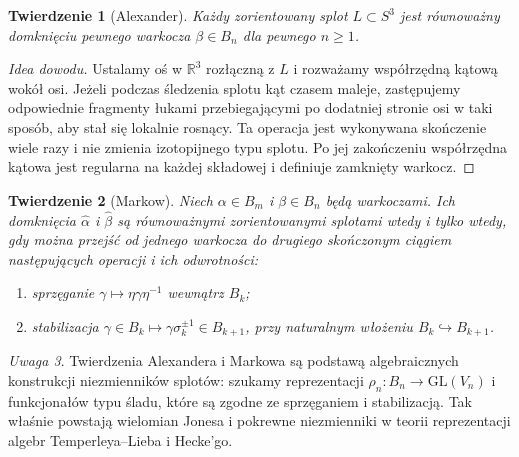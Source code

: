\documentclass[11pt,a4paper]{report}
\numberwithin{equation}{section}
\theoremstyle{plain}
\newtheorem{twierdzenie}{Twierdzenie}[section]
\theoremstyle{definition}
\theoremstyle{remark}
\newtheorem{uwaga}[twierdzenie]{Uwaga}
\begin{document}
\begin{twierdzenie}[Alexander]
Każdy zorientowany splot $L\subset S^3$ jest równoważny
domknięciu pewnego warkocza $\beta\in B_n$ dla pewnego $n\geq1$.
\end{twierdzenie}

\begin{proof}[Idea dowodu]
Ustalamy oś w $\mathbb R^3$ rozłączną z $L$ i rozważamy
współrzędną kątową wokół osi. Jeżeli podczas śledzenia splotu
kąt czasem maleje, zastępujemy odpowiednie fragmenty łukami
przebiegającymi po dodatniej stronie osi w taki sposób,
aby stał się lokalnie rosnący. Ta operacja jest wykonywana
skończenie wiele razy i nie zmienia izotopijnego typu splotu.
Po jej zakończeniu współrzędna kątowa jest regularna
na każdej składowej i definiuje zamknięty warkocz.
\end{proof}

\begin{twierdzenie}[Markow]
Niech $\alpha\in B_m$ i $\beta\in B_n$ będą warkoczami.
Ich domknięcia $\widehat\alpha$ i $\widehat\beta$ są
równoważnymi zorientowanymi splotami wtedy i tylko wtedy,
gdy można przejść od jednego warkocza do drugiego skończonym
ciągiem następujących operacji i ich odwrotności:
\begin{enumerate}[label=(\roman*)]
\item sprzęganie $\gamma\mapsto\eta\gamma\eta^{-1}$ wewnątrz $B_k$;
\item stabilizacja $\gamma\in B_k\mapsto\gamma\sigma_k^{\pm1}
\in B_{k+1}$, przy naturalnym włożeniu $B_k\hookrightarrow B_{k+1}$.
\end{enumerate}
\end{twierdzenie}

\begin{uwaga}
Twierdzenia Alexandera i Markowa są podstawą algebraicznych
konstrukcji niezmienników splotów: szukamy reprezentacji
$\rho_n\colon B_n\to\mathrm{GL}(V_n)$ i funkcjonałów typu
śladu, które są zgodne ze sprzęganiem i stabilizacją.
Tak właśnie powstają wielomian Jonesa i pokrewne niezmienniki
w teorii reprezentacji algebr Temperleya--Lieba i Hecke'go.
\end{uwaga}
\end{document}
